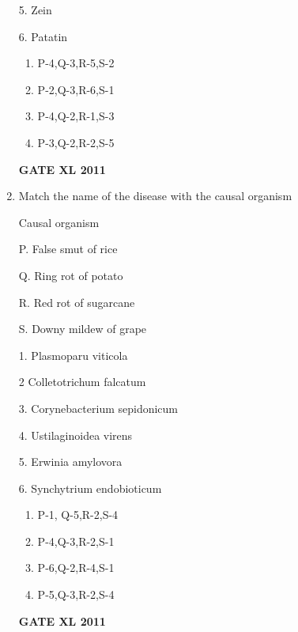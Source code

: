 \documentclass[journal,12pt,onecolumn]{IEEEtran}
\begin{document}
\begin{enumerate}
\begin{minipage}{0.5\textwidth}
\begin{flushleft}
5. Zein

6. Patatin

		\end{flushleft}
		\end{minipage}


		\begin{enumerate}
			\item P-4,Q-3,R-5,S-2
			\item P-2,Q-3,R-6,S-1
			\item P-4,Q-2,R-1,S-3
			\item P-3,Q-2,R-2,S-5
		\end{enumerate}
		\hfill{\textbf{GATE XL 2011}}

\item {Match the name of the disease with the causal organism}

\begin{minipage}{0.5\textwidth}
	\begin{flushleft}
Causal organism

P. False smut of rice

Q. Ring rot of potato

R. Red rot of sugarcane

S. Downy mildew of grape



		\end{flushleft}
		\end{minipage}
	\begin{minipage}{0.5\textwidth}
		\begin{flushleft}

1. Plasmoparu viticola


2 Colletotrichum falcatum


3. Corynebacterium sepidonicum


4. Ustilaginoidea virens

5. Erwinia amylovora

6. Synchytrium endobioticum
		\end{flushleft}
		\end{minipage}

		\begin{enumerate}
			\item P-1, Q-5,R-2,S-4
			\item P-4,Q-3,R-2,S-1
			\item P-6,Q-2,R-4,S-1
			\item P-5,Q-3,R-2,S-4
		\end{enumerate}
		\hfill{\textbf{GATE XL 2011}}



\end{enumerate}
\end{document}

